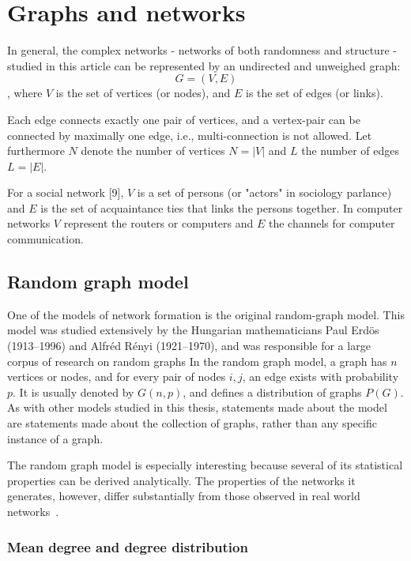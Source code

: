 \chapter{Graphs and networks}

In general, the complex networks - networks of both randomness and structure - studied in this article can be represented by an undirected and unweighed graph:
\begin{equation}
G = (V,E)	
\end{equation}
, where $V$ is the set of vertices (or nodes), and $E$ is the set of edges (or links).

Each edge connects exactly one pair of vertices, and a vertex-pair can be connected by maximally one edge, i.e., multi-connection is not allowed.
Let furthermore $N$ denote the number of vertices $N = |V|$ and $L$ the number of edges $L = |E|$.

For a social network [9], $V$ is a set of persons (or "actors" in sociology parlance) and $E$ is the set of acquaintance ties that links the persons together.
In computer networks $V$ represent the routers or computers and $E$ the channels for computer communication.

\section{Random graph model} %
\label{sec:random_graph_model}



One of the models of network formation is the original random-graph model.
This model was studied extensively by the Hungarian mathematicians Paul Erd\"os (1913–1996) and Alfr\'ed R\'enyi (1921–1970), and was responsible for a large corpus of research on random graphs
In the random graph model, a graph has $n$ vertices or nodes, and for every pair of nodes $i, j$, an edge exists with probability $p$.
It is usually denoted by $G(n, p)$, and defines a distribution of graphs $P(G)$.
As with other models studied in this thesis, statements made about the model are statements made about the collection of graphs, rather than any specific instance of a graph.

The random graph model is especially interesting because several of its statistical properties can be derived analytically.
The properties of the networks it generates, however, differ substantially from those observed in real world networks~\cite{Albert:2002p4071}.


\subsection{Mean degree and degree distribution} %
\label{ssub:mean_degree_and_degree_distribution}


